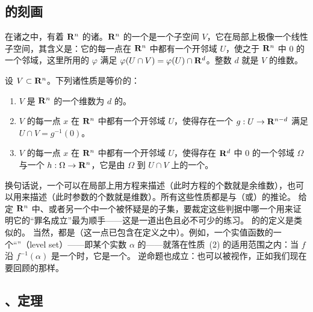 \subsection{\trSubmanifold{}的刻画}
\label{subsec:submanifolds-characterization}

在诸\trManifold{}之中，有着 $\mathbf{R}^{n}$ 的诸\trSubmanifold。$\mathbf{R}^{n}$ 的一个\trSubmanifold{}是一个子空间 $V$，它在局部上极像一个线性子空间，其含义是：它的每一点在 $\mathbf{R}^{n}$ 中都有一个开邻域 $U$，使之\trDiffeomorphic{}于 $\mathbf{R}^{n}$ 中 $0$ 的一个邻域，这里所用的\trDiffeomorphism{} $\varphi$ 满足 $\varphi(U\cap V)=\varphi(U)\cap\mathbf{R}^{d}$。整数 $d$ 就是\trSubmanifold{} $V$ 的维数。

\begin{theorem}\label{thm:submanifolds-characterization}
设 $V\subset\mathbf{R}^{n}$。下列诸性质是等价的：
\begin{enumerate}[label=(\arabic*)]
\item $V$ 是 $\mathbf{R}^{n}$ 的一个维数为 $d$ 的\trSubmanifold。
\item $V$ 的每一点 $x$ 在 $\mathbf{R}^{n}$ 中都有一个开邻域 $U$，使得存在一个\trSubmersion{} $g:U\to\mathbf{R}^{n-d}$ 满足 $U\cap V=g^{-1}(0)$。
\item $V$ 的每一点 $x$ 在 $\mathbf{R}^{n}$ 中都有一个开邻域 $U$，使得存在 $\mathbf{R}^{d}$ 中 $0$ 的一个邻域 $\Omega$ 与一个\trImmersion{} $h:\Omega\to\mathbf{R}^{n}$，它是由 $\Omega$ 到 $U\cap V$ 上的一个\trHomeomorphism。
\end{enumerate}
\end{theorem}

换句话说，一个\trSubmanifold{}可以在局部上用方程来描述（此时方程的个数就是余维数），也可以用\trParametrization{}来描述（此时参数的个数就是维数）。所有这些性质都是\trImplicitFunctionTheorem{}与（或）\trLocalInversionTheorem{}的推论。
给定 $\mathbf{R}^{n}$ 中、或者另一个\trManifold{}中一个被怀疑是\trSubmanifold{}的子集，要裁定这些判据中哪一个用来证明它的“罪名成立”最为顺手——这是一道出色且必不可少的练习。
\trManifold{}的\trSubmanifold{}的定义是类似的。
当然，\trSubmanifold{}都是\trManifold（这一点已包含在定义之中）。例如，一个实值函数的一个“\textbf{\trLevelSet}”（level set）——即某个实数 $\alpha$ 的\trPreimage——就落在性质~(2) 的适用范围之内：当 $f$ 沿 $f^{-1}(\alpha)$ 是一个\trSubmersion{}时，它是一个\trSubmanifold。
逆命题也成立：\trManifold{}也可以被视作\trSubmanifold，正如我们现在要回顾的那样。

\subsection{\trPartitionOfUnity、\trEmbedding{}定理}
\label{subsec:partitions-unity-embedding}

